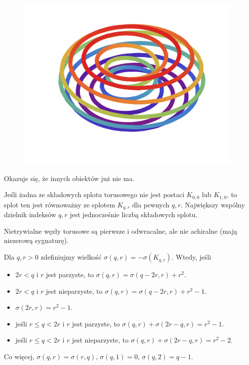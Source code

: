 \begin{figure}[H]
\begin{minipage}[b]{.3\linewidth}
        \centering
        \includegraphics[width=\linewidth]{../data/torus-p11-q2.pdf}
    \end{minipage}
\end{figure}

Okazuje się, że innych obiektów już nie ma.

\begin{proposition}
    Jeśli żadna ze składowych splotu torusowego nie jest postaci $K_{0, 0}$ lub $K_{1, 0}$, to splot ten jest równoważny ze splotem $K_{q, r}$ dla pewnych $q, r$.
    Największy wspólny dzielnik indeksów $q, r$ jest jednocześnie liczbą składowych splotu.
\end{proposition}


Nietrywialne węzły torusowe są pierwsze i odwracalne, ale nie achiralne (mają niezerową sygnaturę).

\begin{proposition}
    Dla $q, r > 0$ zdefiniujmy wielkość $\sigma(q, r) = - \sigma(K_{q, r})$.
    Wtedy, jeśli
    \begin{itemize}[leftmargin=*]
    \itemsep0em
        \item $2r < q$ i $r$ jest parzyste, to $\sigma(q, r) = \sigma(q-2r, r) + r^2$.
        \item $2r < q$ i $r$ jest nieparzyste, to $\sigma(q, r) = \sigma(q-2r, r) + r^2 - 1$.
        \item $\sigma(2r, r) = r^2 - 1$.
        \item jeśli $r \le q < 2r$ i $r$ jest parzyste, to $\sigma(q, r) + \sigma(2r-q, r) = r^2-1$.
        \item jeśli $r \le q < 2r$ i $r$ jest nieparzyste, to $\sigma(q, r) + \sigma(2r-q, r) = r^2-2$.
    \end{itemize}
    Co więcej, $\sigma(q, r) = \sigma(r, q)$, $\sigma(q, 1) = 0$, $\sigma(q, 2) = q-1$.
\end{proposition}

